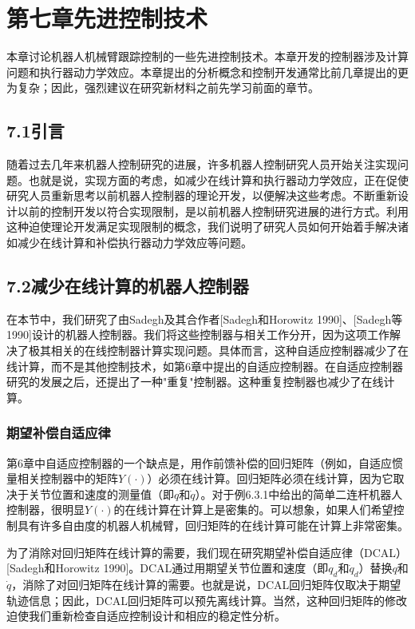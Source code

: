 \documentclass[UTF8]{ctexart}
\begin{document}
\section*{第七章\quad 先进控制技术}

本章讨论机器人机械臂跟踪控制的一些先进控制技术。本章开发的控制器涉及计算问题和执行器动力学效应。本章提出的分析概念和控制开发通常比前几章提出的更为复杂；因此，强烈建议在研究新材料之前先学习前面的章节。

\subsection*{7.1\quad 引言}

随着过去几年来机器人控制研究的进展，许多机器人控制研究人员开始关注实现问题。也就是说，实现方面的考虑，如减少在线计算和执行器动力学效应，正在促使研究人员重新思考以前机器人控制器的理论开发，以便解决这些考虑。不断重新设计以前的控制开发以符合实现限制，是以前机器人控制研究进展的进行方式。利用这种迫使理论开发满足实现限制的概念，我们说明了研究人员如何开始着手解决诸如减少在线计算和补偿执行器动力学效应等问题。

\subsection*{7.2\quad 减少在线计算的机器人控制器}

在本节中，我们研究了由Sadegh及其合作者[Sadegh和Horowitz 1990]、[Sadegh等1990]设计的机器人控制器。我们将这些控制器与相关工作分开，因为这项工作解决了极其相关的在线控制器计算实现问题。具体而言，这种自适应控制器减少了在线计算，而不是其他控制技术，如第6章中提出的自适应控制器。在自适应控制器研究的发展之后，还提出了一种"重复"控制器。这种重复控制器也减少了在线计算。

\subsubsection*{期望补偿自适应律}

第6章中自适应控制器的一个缺点是，用作前馈补偿的回归矩阵（例如，自适应惯量相关控制器中的矩阵$Y(\cdot)$）必须在线计算。回归矩阵必须在线计算，因为它取决于关节位置和速度的测量值（即$q$和$\dot{q}$）。对于例6.3.1中给出的简单二连杆机器人控制器，很明显$Y(\cdot)$的在线计算在计算上是密集的。可以想象，如果人们希望控制具有许多自由度的机器人机械臂，回归矩阵的在线计算可能在计算上非常密集。

为了消除对回归矩阵在线计算的需要，我们现在研究期望补偿自适应律（DCAL）[Sadegh和Horowitz 1990]。DCAL通过用期望关节位置和速度（即$q_d$和$\dot{q}_d$）替换$q$和$\dot{q}$，消除了对回归矩阵在线计算的需要。也就是说，DCAL回归矩阵仅取决于期望轨迹信息；因此，DCAL回归矩阵可以预先离线计算。当然，这种回归矩阵的修改迫使我们重新检查自适应控制设计和相应的稳定性分析。
\end{document}
